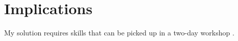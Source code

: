 \section{Implications}

My solution requires skills that can be picked up in a two-day workshop \citep{Wilson2014}.